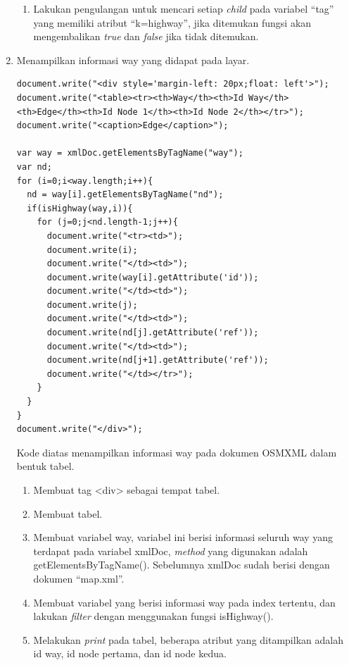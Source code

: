 \begin{enumerate}
\begin{enumerate}
  \item Lakukan pengulangan untuk mencari setiap \textit{child} pada variabel
  ``tag'' yang memiliki atribut ``k=highway'', jika ditemukan fungsi akan
  mengembalikan \textit{true} dan \textit{false} jika tidak ditemukan.
\end{enumerate}
	
	\item Menampilkan informasi way yang didapat pada layar.
\begin{verbatim}
document.write("<div style='margin-left: 20px;float: left'>");
document.write("<table><tr><th>Way</th><th>Id Way</th>
<th>Edge</th><th>Id Node 1</th><th>Id Node 2</th></tr>");
document.write("<caption>Edge</caption>");

var way = xmlDoc.getElementsByTagName("way");
var nd;
for (i=0;i<way.length;i++){
  nd = way[i].getElementsByTagName("nd");
  if(isHighway(way,i)){
    for (j=0;j<nd.length-1;j++){
      document.write("<tr><td>");
      document.write(i);
      document.write("</td><td>");
      document.write(way[i].getAttribute('id'));
      document.write("</td><td>");
      document.write(j);
      document.write("</td><td>");
      document.write(nd[j].getAttribute('ref'));
      document.write("</td><td>");
      document.write(nd[j+1].getAttribute('ref'));	
      document.write("</td></tr>");
    }
  }
}
document.write("</div>");
\end{verbatim}
Kode diatas menampilkan informasi way pada dokumen OSMXML dalam bentuk tabel.
\begin{enumerate}
  \item Membuat tag <div> sebagai tempat tabel.
  
  \item Membuat tabel.
  
  \item Membuat variabel way, variabel ini berisi informasi seluruh way yang
  terdapat pada variabel xmlDoc, \textit{method} yang digunakan adalah
  getElementsByTagName(). Sebelumnya xmlDoc sudah berisi dengan dokumen ``map.xml''.
  
  \item Membuat variabel yang berisi informasi way pada index tertentu, dan
  lakukan \textit{filter} dengan menggunakan fungsi isHighway().
  
  \item Melakukan \textit{print} pada tabel, beberapa atribut yang ditampilkan
  adalah id way, id node pertama, dan id node kedua.
\end{enumerate}
\end{enumerate}
